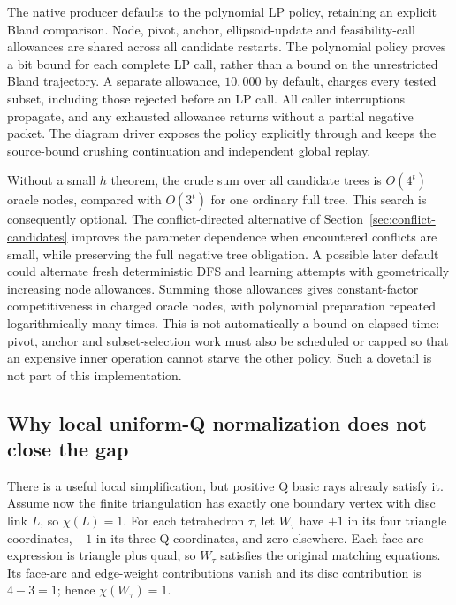 The native producer defaults to the polynomial LP policy, retaining an
explicit Bland comparison.  Node, pivot, anchor, ellipsoid-update and
feasibility-call allowances are shared across all candidate restarts.
The polynomial policy proves a bit bound for each complete LP call, rather
than a bound on the unrestricted Bland trajectory.  A separate  allowance,
$10{,}000$ by default, charges every tested subset, including those rejected
before an LP call.  All caller interruptions propagate, and any exhausted
allowance returns  without a partial negative packet.
The diagram driver exposes the policy explicitly through
 and keeps the source-bound crushing
continuation and independent global replay.

Without a small $h$ theorem, the crude sum over all candidate trees is
$O(4^t)$ oracle nodes, compared with $O(3^t)$ for one ordinary full tree.
This search is consequently optional.  The conflict-directed alternative
of Section~\ref{sec:conflict-candidates} improves the parameter dependence
when encountered conflicts are small, while preserving the full negative
tree obligation.  A possible later default could
alternate fresh deterministic DFS and learning attempts with geometrically
increasing node allowances.  Summing those allowances gives constant-factor
competitiveness in charged oracle nodes, with polynomial preparation
repeated logarithmically many times.  This is not automatically a bound
on elapsed time: pivot, anchor and subset-selection work must also be
scheduled or capped so that an expensive inner operation cannot starve
the other policy.  Such a dovetail is not part of this implementation.

\subsection{Why local uniform-Q normalization does not close the gap}

There is a useful local simplification, but positive Q basic rays already
satisfy it.  Assume now the finite triangulation has exactly one boundary
vertex with disc link $L$, so $\chi(L)=1$.  For each tetrahedron $\tau$,
let $W_\tau$ have $+1$ in its four triangle coordinates, $-1$ in its
three Q coordinates, and zero elsewhere.  Each face-arc expression is
triangle plus quad, so $W_\tau$ satisfies the original matching equations.
Its face-arc and edge-weight contributions vanish and its disc contribution
is $4-3=1$; hence $\chi(W_\tau)=1$.

